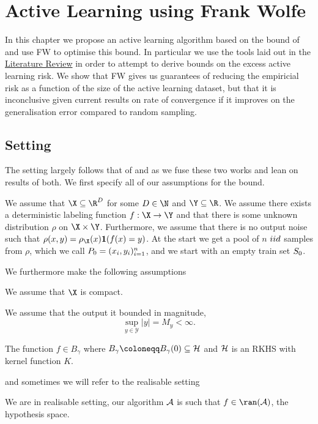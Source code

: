 \chapter{Active Learning using Frank Wolfe}
\label{ch:methodology}
In this chapter we propose an active learning algorithm based on the bound of
\citep{viering17_nuclear_discr_activ_learn} and use FW to optimise this bound. In
particular we use the tools laid out in the \hyperref[ch:lit-rev]{Literature Review}
in order to attempt to derive bounds on the excess active learning risk.
We show that FW gives us guarantees of reducing the empiricial risk as a
function of the size of the active learning dataset, but that it is inconclusive
given current results on rate of convergence if it improves on the
generalisation error compared to random sampling.

\section{Setting}
The setting largely follows that of \citep{viering17_nuclear_discr_activ_learn} and
\citep{bach12_equiv_between_herdin_condit_gradien_algor} as we fuse these two works and
lean on results of both. We first specify all of our assumptions for the bound.

\begin{assumption}
  \label{as:al-fw}
  We assume that \(\X \subseteq \R^{D}\) for some \(D \in \N\) and \(\Y \subseteq
  \R\). We assume there exists a deterministic labeling function \(f : \X \to
  \Y\) and that there is some unknown distribution \(\rho\) on \(\X \times \Y\).
  Furthermore, we assume that there is no output noise such that \(\rho(x, y) = \rho_{\X}(x)\mathbf{1}(f(x) =
  y)\). At the start we get a pool of \(n\) \(iid\) samples from \(\rho\), which we
  call \(P_{0} = (x_{i}, y_{i})_{i=1}^{n}\), and we start with an empty train
  set \(S_{0}\).
\end{assumption}
We furthermore make the following assumptions
\begin{assumption}
  \label{as:domain-is-compact}
  We assume that \(\X\) is compact.
\end{assumption}
\begin{assumption}
  We assume that the output it bounded in magnitude,
  \label{as:output-bounded}
  \begin{equation*}
    \sup_{y \in \mathcal{Y}}|y| = M_y < \infty.
  \end{equation*}
\end{assumption}
\begin{assumption}
  \label{as:f-in-gamma-ball}
  The function \(f \in B_{\gamma}\) where \(B_{\gamma} \coloneqq B_{\gamma}(0) \subseteq \rkhs{H}\) and \(\mathcal{H}\) is an RKHS with kernel function \(K\).
\end{assumption}
and sometimes we will refer to the realisable setting
\begin{assumption}
  \label{as:realisable-setting}
  We are in realisable setting, our algorithm \(\mathcal{A}\) is such that \(f \in
  \ran(\algo)\), the hypothesis space.
\end{assumption}

